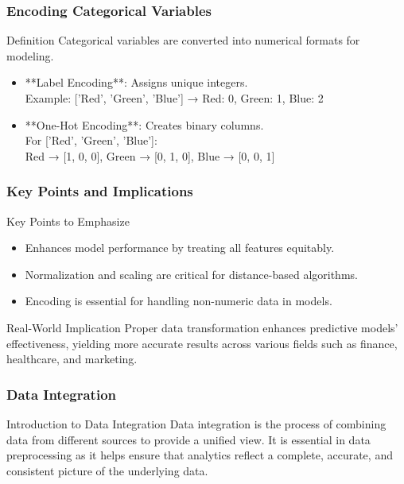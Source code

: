 \documentclass[aspectratio=169]{beamer}
\begin{document}
\begin{frame}[fragile]
    \frametitle{Encoding Categorical Variables}
    \begin{block}{Definition}
        Categorical variables are converted into numerical formats for modeling.
    \end{block}
    \begin{itemize}
        \item **Label Encoding**: Assigns unique integers. \\
        Example: ['Red', 'Green', 'Blue'] → {Red: 0, Green: 1, Blue: 2}
        \item **One-Hot Encoding**: Creates binary columns. \\
        For ['Red', 'Green', 'Blue']: \\
        Red → [1, 0, 0], Green → [0, 1, 0], Blue → [0, 0, 1]
    \end{itemize}
\end{frame}

\begin{frame}[fragile]
    \frametitle{Key Points and Implications}
    \begin{block}{Key Points to Emphasize}
        \begin{itemize}
            \item Enhances model performance by treating all features equitably.
            \item Normalization and scaling are critical for distance-based algorithms.
            \item Encoding is essential for handling non-numeric data in models.
        \end{itemize}
    \end{block}
    
    \begin{block}{Real-World Implication}
        Proper data transformation enhances predictive models' effectiveness, yielding more accurate results across various fields such as finance, healthcare, and marketing.
    \end{block}
\end{frame}

\begin{frame}
    \frametitle{Data Integration}
    \begin{block}{Introduction to Data Integration}
        Data integration is the process of combining data from different sources to provide a unified view. It is essential in data preprocessing as it helps ensure that analytics reflect a complete, accurate, and consistent picture of the underlying data.
    \end{block}
\end{frame}
\end{document}
